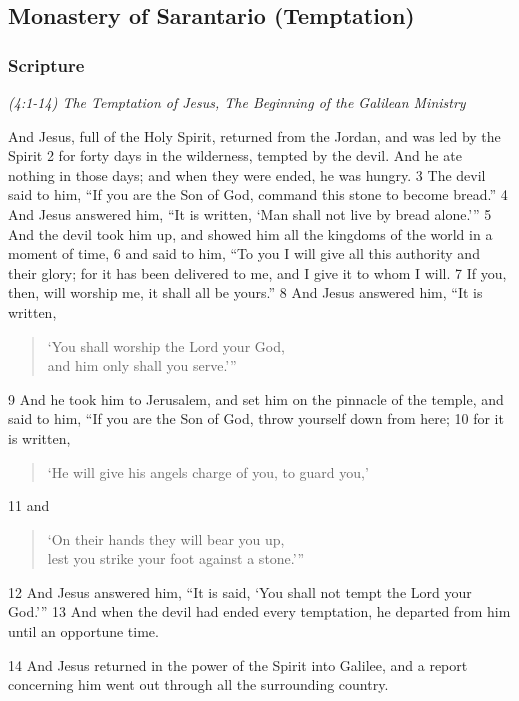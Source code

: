 \documentclass[letterpaper]{report}
\begin{document}
\clearpage
\subsection{Monastery of Sarantario (Temptation)}
\begin{multicols}{2}
	\mbox{}
\end{multicols}
\subsubsection{Scripture}

{\centering
	\emph{(4:1-14) The Temptation of Jesus,
		The Beginning of the Galilean Ministry}\
}
\begin{multicols}{2}
And Jesus, full of the Holy Spirit, returned from the Jordan, and was led by the Spirit 2 for forty days in the wilderness, tempted by the devil. And he ate nothing in those days; and when they were ended, he was hungry. 3 The devil said to him, “If you are the Son of God, command this stone to become bread.” 4 And Jesus answered him, “It is written, ‘Man shall not live by bread alone.’” 5 And the devil took him up, and showed him all the kingdoms of the world in a moment of time, 6 and said to him, “To you I will give all this authority and their glory; for it has been delivered to me, and I give it to whom I will. 7 If you, then, will worship me, it shall all be yours.” 8 And Jesus answered him, “It is written,

\begin{verse}
‘You shall worship the Lord your God,\\
and him only shall you serve.’”\\
\end{verse}

9 And he took him to Jerusalem, and set him on the pinnacle of the temple, and said to him, “If you are the Son of God, throw yourself down from here; 10 for it is written,

\begin{verse}
‘He will give his angels charge of you, to guard you,’\\
\end{verse}

11 and

\begin{verse}
‘On their hands they will bear you up,\\
lest you strike your foot against a stone.’”\\
\end{verse}

12 And Jesus answered him, “It is said, ‘You shall not tempt the Lord your God.’” 13 And when the devil had ended every temptation, he departed from him until an opportune time.

14 And Jesus returned in the power of the Spirit into Galilee, and a report concerning him went out through all the surrounding country.
\end{multicols}
\end{document}
